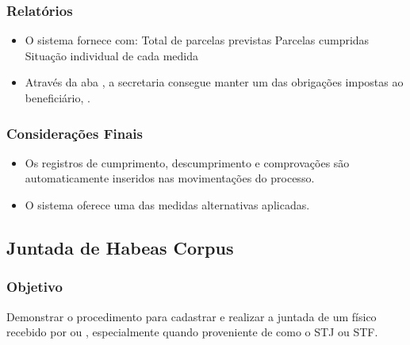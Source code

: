 \documentclass[letterpaper,10pt,brazil]{sphinxmanual}
\begin{document}
\subsubsection{Relatórios}
\label{\detokenize{projud_58_cadastrocumprimentomedida:relatorios}}\begin{itemize}
\item {} 
\sphinxAtStartPar
O sistema fornece  com:
\sphinxhyphen{} Total de parcelas previstas
\sphinxhyphen{} Parcelas cumpridas
\sphinxhyphen{} Situação individual de cada medida

\item {} 
\sphinxAtStartPar
Através da aba , a secretaria consegue manter um  das obrigações impostas ao beneficiário, .

\end{itemize}


\subsubsection{Considerações Finais}
\label{\detokenize{projud_58_cadastrocumprimentomedida:consideracoes-finais}}\begin{itemize}
\item {} 
\sphinxAtStartPar
Os registros de cumprimento, descumprimento e comprovações são automaticamente inseridos nas movimentações do processo.

\item {} 
\sphinxAtStartPar
O sistema oferece uma  das medidas alternativas aplicadas.

\end{itemize}

\sphinxstepscope


\subsection{Juntada de Habeas Corpus}
\label{\detokenize{projud_59_juntadahabeascorpus:juntada-de-habeas-corpus}}\label{\detokenize{projud_59_juntadahabeascorpus::doc}}

\subsubsection{Objetivo}
\label{\detokenize{projud_59_juntadahabeascorpus:objetivo}}
\sphinxAtStartPar
Demonstrar o procedimento para cadastrar e realizar a juntada de um  físico recebido por  ou , especialmente quando proveniente de  como o STJ ou STF.
\end{document}
